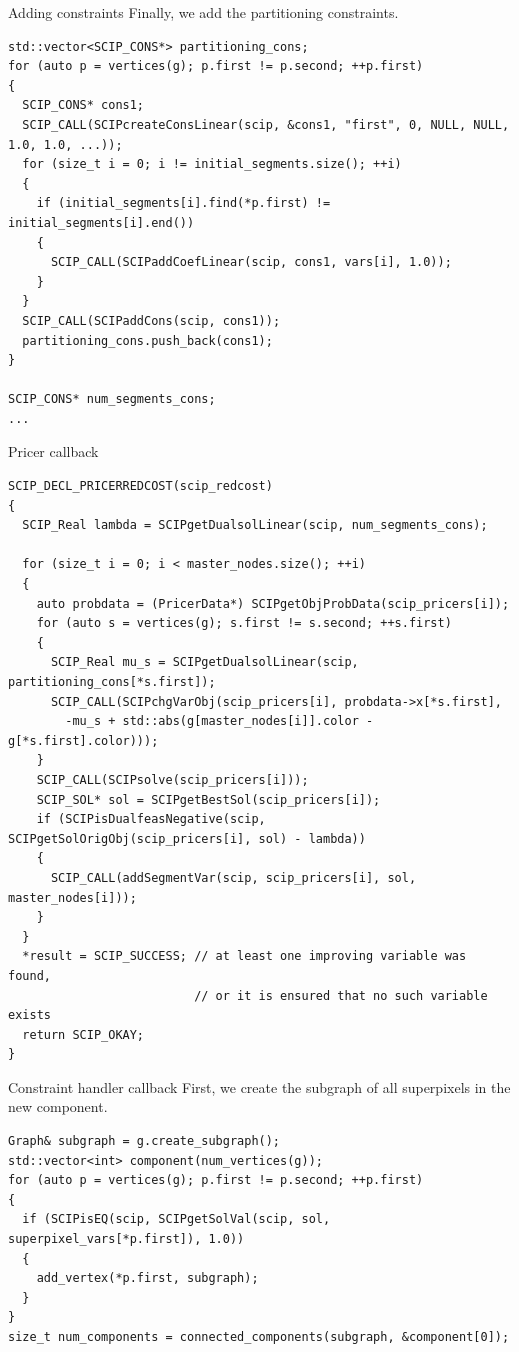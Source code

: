 \documentclass[fleqn]{beamer}
\begin{document}
    \begin{frame}[fragile]{Adding constraints}
        Finally, we add the partitioning constraints.
        \begin{verbatim}
std::vector<SCIP_CONS*> partitioning_cons;
for (auto p = vertices(g); p.first != p.second; ++p.first)
{
  SCIP_CONS* cons1;
  SCIP_CALL(SCIPcreateConsLinear(scip, &cons1, "first", 0, NULL, NULL, 1.0, 1.0, ...));
  for (size_t i = 0; i != initial_segments.size(); ++i)
  {
    if (initial_segments[i].find(*p.first) != initial_segments[i].end())
    {
      SCIP_CALL(SCIPaddCoefLinear(scip, cons1, vars[i], 1.0));
    }
  }
  SCIP_CALL(SCIPaddCons(scip, cons1));
  partitioning_cons.push_back(cons1);
}

SCIP_CONS* num_segments_cons;
...
        \end{verbatim}
	\end{frame}

    \begin{frame}[fragile]{Pricer callback}
        \begin{verbatim}
SCIP_DECL_PRICERREDCOST(scip_redcost)
{
  SCIP_Real lambda = SCIPgetDualsolLinear(scip, num_segments_cons);

  for (size_t i = 0; i < master_nodes.size(); ++i)
  {
    auto probdata = (PricerData*) SCIPgetObjProbData(scip_pricers[i]);
    for (auto s = vertices(g); s.first != s.second; ++s.first)
    {
      SCIP_Real mu_s = SCIPgetDualsolLinear(scip, partitioning_cons[*s.first]);
      SCIP_CALL(SCIPchgVarObj(scip_pricers[i], probdata->x[*s.first],
        -mu_s + std::abs(g[master_nodes[i]].color - g[*s.first].color)));
    }
    SCIP_CALL(SCIPsolve(scip_pricers[i]));
    SCIP_SOL* sol = SCIPgetBestSol(scip_pricers[i]);
    if (SCIPisDualfeasNegative(scip, SCIPgetSolOrigObj(scip_pricers[i], sol) - lambda))
    {
      SCIP_CALL(addSegmentVar(scip, scip_pricers[i], sol, master_nodes[i]));
    }
  }
  *result = SCIP_SUCCESS; // at least one improving variable was found,
                          // or it is ensured that no such variable exists
  return SCIP_OKAY;
}
        \end{verbatim}
    \end{frame}

    \begin{frame}[fragile]{Constraint handler callback}
        First, we create the subgraph of all superpixels in the new component. 
        \begin{verbatim}
Graph& subgraph = g.create_subgraph();
std::vector<int> component(num_vertices(g));
for (auto p = vertices(g); p.first != p.second; ++p.first)
{
  if (SCIPisEQ(scip, SCIPgetSolVal(scip, sol, superpixel_vars[*p.first]), 1.0))
  {
    add_vertex(*p.first, subgraph);
  }
}
size_t num_components = connected_components(subgraph, &component[0]);
         \end{verbatim}
        
    \end{frame}
\end{document}
